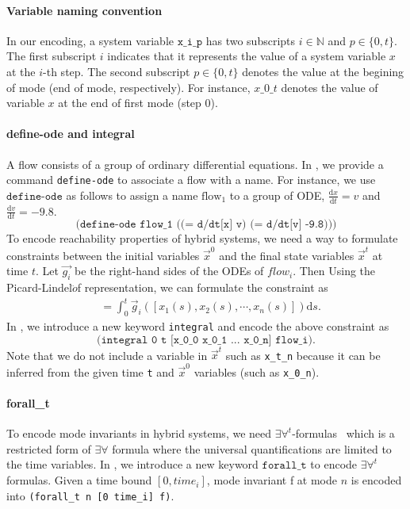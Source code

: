 \paragraph{Variable naming convention}
In our encoding, a system variable $\texttt{x\_i\_p}$ has two
subscripts $i \in \mathbb{N}$ and $p \in \{0, t\}$. The first
subscript $i$ indicates that it represents the value of a system
variable $x$ at the $i$-th step. The second subscript $p \in \{0, t\}$
denotes the value at the begining of mode (end of mode,
respectively). For instance, $x\_0\_t$ denotes the value of variable
$x$ at the end of first mode (step 0).

\paragraph{define-ode and integral}
A flow consists of a group of ordinary differential equations. In
\drh{}, we provide a command \texttt{define-ode} to associate a flow
with a name. For instance, we use $\texttt{define-ode}$ as follows to
assign a name $\mathrm{flow_1}$ to a group of ODE,
$\frac{\mathrm{d}x}{\mathrm{d}t} = v$ and
$\frac{\mathrm{d}v}{\mathrm{d}t} = -9.8$.
\[
\texttt{(define-ode flow\_1 ((= d/dt[x] v) (= d/dt[v] -9.8)))}
\]
To encode reachability properties of hybrid systems, we need a way to
formulate constraints between the initial variables $\vec{x}^0$ and the
final state variables $\vec{x}^t$ at time $t$. Let $\vec{g_i}$ be the
right-hand sides of the ODEs of $flow_i$. Then Using the
Picard-Lindel$\ddot{o}$f representation, we can formulate the
constraint as
\begin{align*}
[x_1^t, x_2^t, \dots, x_n^t] &= \int_0^t \vec{g}_i([x_1(s), x_2(s), \cdots,
x_n(s)]) \mathrm{d}s.
\end{align*}
In \drh{}, we introduce a new keyword \texttt{integral} and encode the
above constraint as
\[
\texttt{(integral 0 t [x\_0\_0 x\_0\_1 ... x\_0\_n] flow\_i)}.
\]
Note that we do not include a variable in $\vec{x}^t$ such as
\texttt{x\_t\_n} because it can be inferred from the given time
\texttt{t} and $\vec{x}^0$ variables (such as \texttt{x\_0\_n}).

\paragraph{forall\_t} To encode mode invariants in hybrid systems, we
need $\exists\forall^t$-formulas~\cite{DBLP:conf/fmcad/GaoKC13} which
is a restricted form of $\exists\forall$ formula where the universal
quantifications are limited to the time variables. In \drh{}, we
introduce a new keyword $\texttt{forall\_t}$ to encode
$\exists\forall^t$ formulas. Given a time bound $[0, time_i]$, mode
invariant f at mode $n$ is encoded into \texttt{(forall\_t n [0
  time\_i] f)}.

